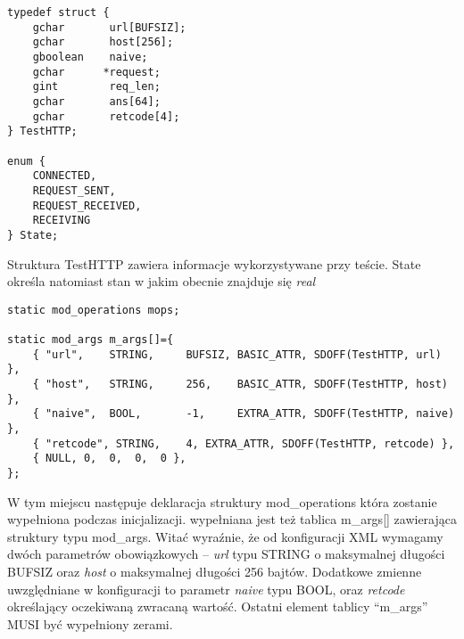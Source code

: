 \documentclass[polish,12pt]{article}
\begin{document}
\begin{verbatim}
typedef struct {
    gchar       url[BUFSIZ];
    gchar       host[256];
    gboolean    naive;
    gchar      *request;
    gint        req_len;
    gchar       ans[64];
    gchar       retcode[4];
} TestHTTP;

enum {
    CONNECTED,
    REQUEST_SENT,
    REQUEST_RECEIVED,
    RECEIVING
} State;
\end{verbatim}
Struktura TestHTTP zawiera informacje wykorzystywane przy teście.
State określa natomiast stan w jakim obecnie znajduje się \textit{real}
\newpage
{\small
\begin{verbatim}
static mod_operations mops;

static mod_args m_args[]={
    { "url",    STRING,     BUFSIZ, BASIC_ATTR, SDOFF(TestHTTP, url)    },
    { "host",   STRING,     256,    BASIC_ATTR, SDOFF(TestHTTP, host)   },
    { "naive",  BOOL,       -1,     EXTRA_ATTR, SDOFF(TestHTTP, naive)  },
    { "retcode", STRING,    4, EXTRA_ATTR, SDOFF(TestHTTP, retcode) },
    { NULL, 0,  0,  0,  0 },
};
\end{verbatim}
}
W tym miejscu następuje deklaracja struktury mod\_operations która zostanie wypełniona podczas inicjalizacji.
\newline
wypełniana jest też tablica m\_args[] zawierająca struktury typu mod\_args.
Witać wyraźnie, że od konfiguracji XML wymagamy dwóch parametrów obowiązkowych -- \textit{url}
typu STRING o maksymalnej długości BUFSIZ oraz \textit{host} o maksymalnej długości 256 bajtów.
Dodatkowe zmienne uwzględniane w konfiguracji to parametr \textit{naive} typu BOOL,
oraz \textit{retcode} określający oczekiwaną zwracaną wartość.
Ostatni element tablicy ``m\_args'' MUSI być wypełniony zerami.
\end{document}
